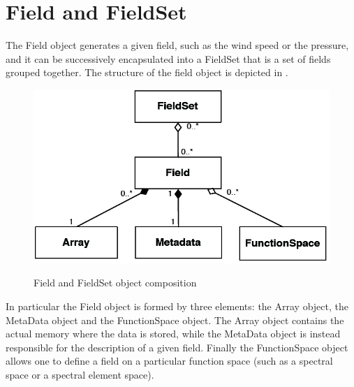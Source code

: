 \section{Field and FieldSet}
The Field object generates a given field, such as the wind speed 
or the pressure, and it can be successively encapsulated into a 
FieldSet that is a set of fields grouped together.
The structure of the field object is depicted in .
%
\begin{figure}
\centering
\includegraphics[scale=0.25]{imgs/field.png}
\label{fig:field}
\caption{Field and FieldSet object composition}
\end{figure}
%
In particular the Field object is formed by three elements:
the Array object, the MetaData object and the FunctionSpace 
object. The Array object contains the actual memory where the 
data is stored, while the MetaData object is instead responsible 
for the description of a given field. Finally the FunctionSpace
object allows one to define a field on a particular function 
space (such as a spectral space or a spectral element space).


 
